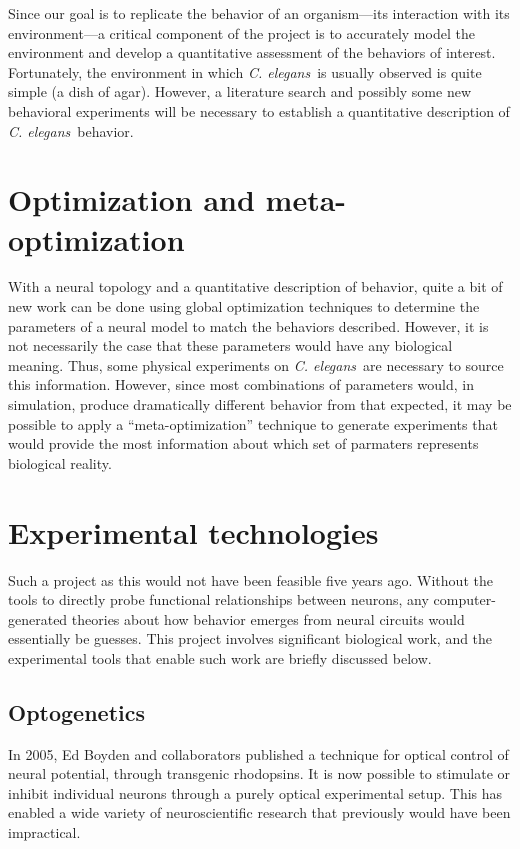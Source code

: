 \documentclass[letter,11pt]{article}
\newcommand{\cel}{{\em C. elegans}}
\begin{document}
Since our goal is to replicate the behavior of an organism---its interaction with
its environment---a critical component of the project is to accurately model the
environment and develop a quantitative assessment of the behaviors of interest.
Fortunately, the environment in which \cel\ is usually observed is quite simple
(a dish of agar). However, a literature search and possibly some new behavioral
experiments will be necessary to establish a quantitative description of \cel\ 
behavior.

\section{Optimization and meta-optimization}

With a neural topology and a quantitative description of behavior, quite a bit
of new work can be done using global optimization techniques to determine the
parameters of a neural model to match the behaviors described. However, it is
not necessarily the case that these parameters would have any biological
meaning. Thus, some physical experiments on \cel\ are necessary to source this
information. However, since most combinations of parameters would, in simulation,
produce dramatically different behavior from that expected, it may be possible to
apply a ``meta-optimization'' technique to generate experiments that would 
provide the most information about which set of parmaters represents biological
reality.

\section{Experimental technologies}

Such a project as this would not have been feasible five years ago. Without the
tools to directly probe functional relationships between neurons, any computer-
generated theories about how behavior emerges from neural circuits would
essentially be guesses. This project involves significant biological work, and
the experimental tools that enable such work are briefly discussed below.

\subsection{Optogenetics}

In 2005, Ed Boyden and collaborators published a technique for optical control of
neural potential, through transgenic rhodopsins. It is now possible to stimulate
or inhibit individual neurons through a purely optical experimental setup. This
has enabled a wide variety of neuroscientific research that previously would have
been impractical.
\end{document}
